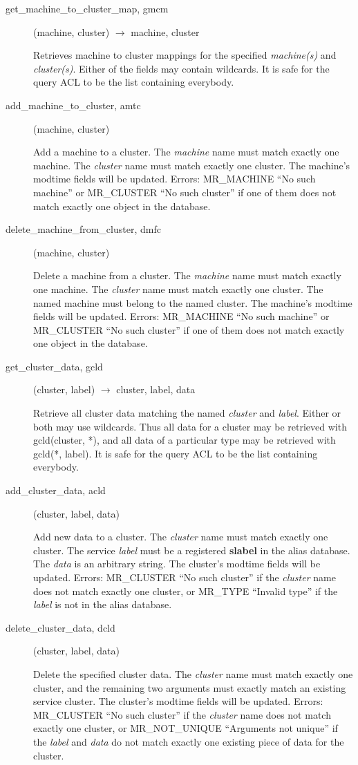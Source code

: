 \begin{description}
\item[get\_machine\_to\_cluster\_map, gmcm](machine, cluster)
$\rightarrow$ machine, cluster

Retrieves machine to cluster mappings for the specified {\em
machine(s)\/} and {\em cluster(s)}. Either of the fields may contain
wildcards. It is safe for the query ACL to be the list containing
everybody.

\item[add\_machine\_to\_cluster, amtc](machine, cluster)

Add a machine to a cluster.  The {\em machine} name must match exactly
one machine.  The {\em cluster} name must match exactly one cluster.
The machine's modtime fields will be updated.  Errors: MR\_MACHINE ``No
such machine'' or MR\_CLUSTER ``No such cluster'' if one of them does not
match exactly one object in the database.

\item[delete\_machine\_from\_cluster, dmfc](machine, cluster)

Delete a machine from a cluster.  The {\em machine} name must match
exactly one machine.  The {\em cluster} name must match exactly one
cluster.  The named machine must belong to the named cluster.  The
machine's modtime fields will be updated.  Errors: MR\_MACHINE ``No
such machine'' or MR\_CLUSTER ``No such cluster'' if one of them does not
match exactly one object in the database.

\item[get\_cluster\_data, gcld](cluster, label) $\rightarrow$ cluster, label,
data

Retrieve all cluster data matching the named {\em cluster} and {\em label}.
Either or both may use wildcards.  Thus all data for a cluster may be
retrieved with gcld(cluster, *), and all data of a particular type may
be retrieved with gcld(*, label).  It is safe for the query ACL to be
the list containing everybody.

\item[add\_cluster\_data, acld](cluster, label, data)

Add new data to a cluster.  The {\em cluster} name must match exactly
one cluster.  The service {\em label} must be a registered {\bf slabel} in
the alias database.  The {\em data} is an arbitrary string.  The
cluster's modtime fields will be updated.  Errors: MR\_CLUSTER ``No
such cluster'' if the {\em cluster} name does not match exactly one
cluster, or MR\_TYPE ``Invalid type'' if the {\em label} is not in the
alias database.

\item[delete\_cluster\_data, dcld](cluster, label, data)

Delete the specified cluster data.  The {\em cluster} name must match
exactly one cluster, and the remaining two arguments must exactly
match an existing service cluster.  The cluster's modtime fields will
be updated.  Errors: MR\_CLUSTER ``No such cluster'' if the {\em cluster}
name does not match exactly one cluster, or MR\_NOT\_UNIQUE ``Arguments
not unique'' if the {\em label} and {\em data} do not match exactly one
existing piece of data for the cluster.

\end{description}

